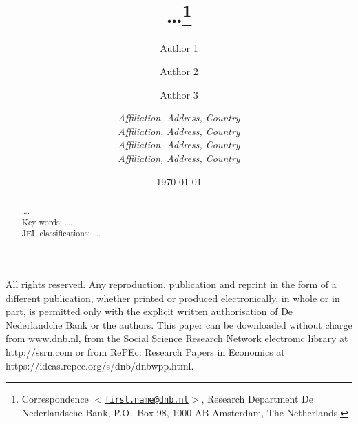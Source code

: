 \documentclass[11pt]{article}
\begin{document}
\noindent All rights reserved. Any reproduction, publication and reprint in the form of a different publication, whether printed or produced electronically, in whole or in part, is permitted only with the explicit written authorisation of De Nederlandche Bank or the authors. This paper can be downloaded without charge from www.dnb.nl, from the Social Science Research Network electronic library at http://ssrn.com or from RePEc: Research Papers in Economics at https://ideas.repec.org/s/dnb/dnbwpp.html.

\clearpage

\title{\bf \ldots\footnote{Correspondence $<$\texttt{\href{mailto:first.name@dnb.nl}{first.name@dnb.nl}}$>$, Research Department De Nederlandsche Bank, P.O.\ Box 98, 1000 AB Amsterdam, The Netherlands.}}

\author{Author 1 \and Author 2 \and Author 3
\and \skiplinehalf
{} \it \normalsize Affiliation, Address, Country \\
 \it \normalsize Affiliation, Address, Country \\
 \it \normalsize Affiliation, Address, Country \\
 \it \normalsize Affiliation, Address, Country
}

\date{\today}
\maketitle

\begin{abstract}
\noindent \ldots.\\[10pt]

\noindent Key words: \ldots. \\
	JEL classifications: \ldots.
\end{abstract}

\thispagestyle{empty}

\clearpage

\end{document}
